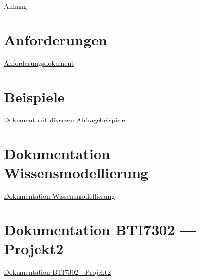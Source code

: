 \begin{titlepage}


    \clearpage
    \vspace*{\fill}
    \begin{center}
        \begin{minipage}{.6\textwidth}
            \fontsize{26pt}{28pt}\selectfont
            Anhang
        \end{minipage}
    \end{center}
    \vfill %
    \clearpage


\end{titlepage}

\newpage 


\appendix

\section*{Anforderungen}
\label{sec:anhang:anforderungen}
\href{anhang/anforderungen.pdf}{Anforderungsdokument}

\section*{Beispiele}
\label{sec:anhang:sparql_beispiele}
\href{anhang/schnipsel.pdf}{Dokument mit diversen Abfragebeispielen}

\section*{Dokumentation Wissensmodellierung}
\label{sec:anhang:tutorial_dokument}
\href{../Tutorial/template.pdf}{Dokumentation Wissensmodellierung}

\section*{Dokumentation BTI7302 --- Projekt2}
\label{sec:anhang:projekt2}
\href{../Extern/EigeneDokumente/DokumentationProjekt2.pdf}{Dokumentation BTI7302 - Projekt2}

